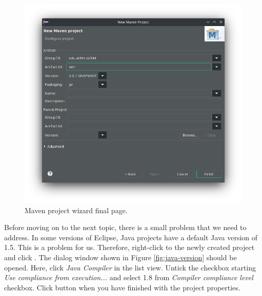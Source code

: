 \begin{figure}[H]
    \centering
    \includegraphics[width=\textwidth]{images/maven-app-conf.png}
    \caption{Maven project wizard final page.}
    \label{fig:maven-app-conf}
\end{figure}

Before moving on to the next topic, there is a small problem that we need to address. In some versions of Eclipse, Java projects have a default Java version of 1.5. This is a problem for us. Therefore, right-click to the newly created project and click . The dialog window shown in Figure \ref{fig:java-version} should be opened. Here, click \emph{Java Compiler} in the list view. Untick the checkbox starting \emph{Use compliance from execution...} and select 1.8 from \emph{Compiler compliance level} checkbox. Click  button when you have finished with the project properties.

